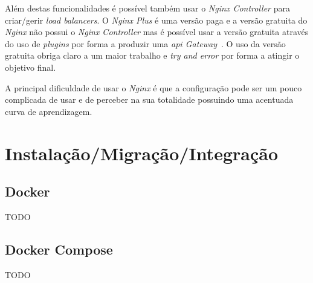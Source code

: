 Além destas funcionalidades é possível também usar o \textit{Nginx Controller} para criar/gerir \textit{load balancers}. O \textit{Nginx Plus} é uma versão paga e a versão gratuita do \textit{Nginx} não possui o \textit{Nginx Controller} mas é possível usar a versão gratuita através do uso de \textit{plugins} por forma a produzir uma \textit{\acrshort{api} Gateway}~\cite{compAPIGat}. O uso da versão gratuita obriga claro a um maior trabalho e \textit{try and error} por forma a atingir o objetivo final.

A principal dificuldade de usar o \textit{Nginx} é que a configuração pode ser um pouco complicada de usar e de perceber na sua totalidade possuindo uma acentuada curva de aprendizagem.

\section{Instalação/Migração/Integração}

\subsection{Docker}
TODO

\subsection{Docker Compose}
TODO
